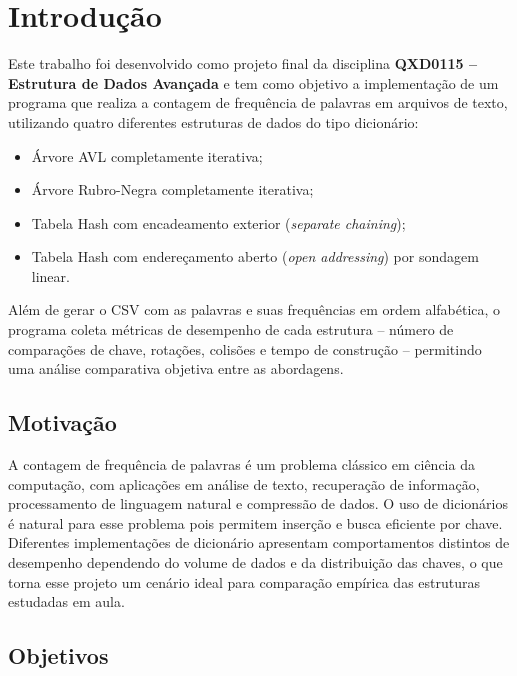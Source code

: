 \documentclass[12pt, a4paper]{article}
\begin{document}
\section{Introdução}

Este trabalho foi desenvolvido como projeto final da disciplina \textbf{QXD0115 -- Estrutura
de Dados Avançada} e tem como objetivo a implementação de um programa que realiza a
contagem de frequência de palavras em arquivos de texto, utilizando quatro diferentes
estruturas de dados do tipo dicionário:

\begin{itemize}
    \item Árvore AVL completamente iterativa;
    \item Árvore Rubro-Negra completamente iterativa;
    \item Tabela Hash com encadeamento exterior (\textit{separate chaining});
    \item Tabela Hash com endereçamento aberto (\textit{open addressing}) por sondagem linear.
\end{itemize}

Além de gerar o CSV com as palavras e suas frequências em ordem alfabética, o programa
coleta métricas de desempenho de cada estrutura -- número de comparações de chave,
rotações, colisões e tempo de construção -- permitindo uma análise comparativa objetiva
entre as abordagens.

\subsection{Motivação}

A contagem de frequência de palavras é um problema clássico em ciência da computação,
com aplicações em análise de texto, recuperação de informação, processamento de linguagem
natural e compressão de dados. O uso de dicionários é natural para esse problema pois
permitem inserção e busca eficiente por chave. Diferentes implementações de dicionário
apresentam comportamentos distintos de desempenho dependendo do volume de dados e da
distribuição das chaves, o que torna esse projeto um cenário ideal para comparação
empírica das estruturas estudadas em aula.

\subsection{Objetivos}
\end{document}
